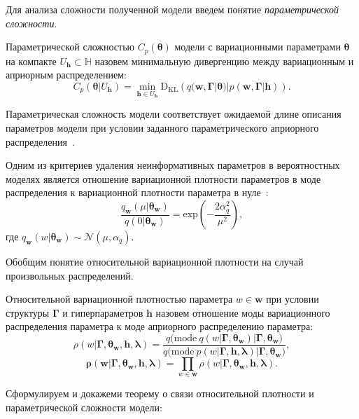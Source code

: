 Для анализа сложности полученной модели введем понятие \textit{параметрической сложности}. 
\begin{defin} 
Параметрической сложностью  $C_p(\boldsymbol{\theta})$ модели с вариационными параметрами $\boldsymbol{\theta}$ на компакте $U_\mathbf{h} \subset \mathbb{H}$ назовем минимальную дивергенцию между вариационным и априорным распределением:
\[
C_p(\boldsymbol{\theta}|U_\mathbf{h}) = \min_{\mathbf{h} \in U_\mathbf{h}} \text{D}_\text{KL}\left(q(\mathbf{w}, \boldsymbol{\Gamma}|\boldsymbol{\theta})|p(\mathbf{w}, \boldsymbol{\Gamma}|\mathbf{h})\right).
\]
\end{defin}
Параметрическая сложность модели соответствует ожидаемой длине описания параметров модели при условии заданного параметрического априорного распределения~\cite{hinton_mdl}.

Одним из критериев удаления неинформативных параметров в вероятностных моделях является отношение вариационной плотности параметров в моде распределения к вариационной плотности параметра в нуле~\cite{nips}:
\[
    \frac{q_\mathbf{w}(\mu|\boldsymbol{\theta}_\mathbf{w})}{q(0|\boldsymbol{\theta}_\mathbf{w})} = \text{exp}\left(-\frac{2\alpha_q^2}{\mu^2}\right),
\]
где $q_\mathbf{w}(w|\boldsymbol{\theta}_\mathbf{w}) \sim \mathcal{N}(\mu, \alpha_q).$

Обобщим понятие относительной вариационной плотности на случай произвольных распределений.
\begin{defin}
Относительной вариационной   плотностью параметра $w \in \mathbf{w}$  при условии структуры $\boldsymbol{\Gamma}$ и гиперпараметров $\mathbf{h}$ назовем отношение моды вариационного распределения параметра к моде априорного распределению параметра:
\[
    \rho(w|\boldsymbol{\Gamma}, \boldsymbol{\theta}_\mathbf{w}, \mathbf{h},\boldsymbol{\lambda}) = \frac{q\bigl(\text{mode}~q\left(w|\boldsymbol{\Gamma}, \boldsymbol{\theta}_\mathbf{w}\right)|\boldsymbol{\Gamma}, \boldsymbol{\theta}_\mathbf{w}\bigr)}{q\bigl(\text{mode}~p\left({w}|\boldsymbol{\Gamma}, \mathbf{h},\boldsymbol{\lambda}\right)|\boldsymbol{\Gamma},\boldsymbol{\theta}_\mathbf{w}\bigr)},
\]
\[
    \boldsymbol{\rho}(\mathbf{w}|\boldsymbol{\Gamma}, \boldsymbol{\theta}_\mathbf{w}, \mathbf{h},\boldsymbol{\lambda}) = \prod_{w \in \mathbf{w}}\rho(w|\boldsymbol{\Gamma}, \boldsymbol{\theta}_\mathbf{w}, \mathbf{h},\boldsymbol{\lambda}).
\]

\end{defin}

Сформулируем и докажеми теорему о связи относительной плотности и параметрической сложности модели:

